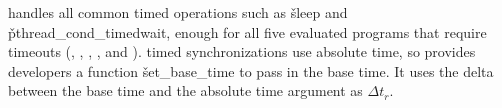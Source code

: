 
\parrot handles all common timed operations such as \v{sleep} and
\v{pthread\_cond\_timedwait}, enough for all five evaluated programs
that require timeouts (\pbzip, \bdb, \mplayer, \imagick, and \redis).
\pthread timed synchronizations use absolute time, so \parrot provides
developers a function \v{set\_base\_time} to pass in the base time.  It
uses the delta between the base time and the absolute time argument as $\Delta
t_r$.







